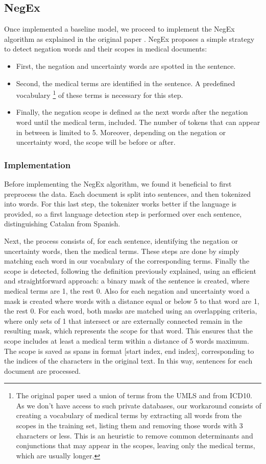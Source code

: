 \documentclass{article}
\begin{document}
\subsection*{NegEx}
Once implemented a baseline model, we proceed to implement the NegEx algorithm as explained in the original
paper \cite{negex}. NegEx proposes a simple strategy to detect negation words and their scopes in medical documents:
\begin{itemize}
	\item First, the negation and uncertainty words are spotted in the sentence. 
	\item Second, the medical terms are identified in the sentence. A predefined vocabulary \footnote{The original
	paper used a union of terms from the UMLS and from ICD10. As we don’t have access to such private databases,
	our workaround consists of creating a vocabulary of medical terms by extracting all words from the scopes in the
	training set, listing them and removing those words with 3 characters or less. This is an heuristic to remove common
	determinants and conjunctions that may appear in the scopes, leaving only the medical terms, which are usually
	longer.} of these terms is necessary for this step.
	\item Finally, the negation scope is defined as the next words after the negation word until the medical term,
	included. The number of tokens that can appear in between is limited to 5. Moreover, depending on the negation
	or uncertainty word, the scope will be before or after.
\end{itemize}

\subsubsection*{Implementation}
Before implementing the NegEx algorithm, we found it beneficial to first preprocess the data. Each document is split
into sentences, and then tokenized into words. For this last step, the tokenizer works better if the language is provided,
so a first language detection step is performed over each sentence, distinguishing Catalan from Spanish.

Next, the process consists of, for each sentence, identifying the negation or uncertainty words, then the medical terms.
These steps are done by simply matching each word in our vocabulary of the corresponding terms. Finally the scope is detected,
following the definition previously explained, using an efficient and straightforward approach: a binary mask of the sentence
is created, where medical terms are 1, the rest 0. Also for each negation and uncertainty word a mask is created where words
with a distance equal or below 5 to that word are 1, the rest 0. For each word, both masks are matched using an overlapping
criteria, where only sets of 1 that intersect or are externally connected remain in the resulting mask, which represents the
scope for that word. This ensures that the scope includes at least a medical term within a distance of 5 words maximum.
The scope is saved as spans in format [start index, end index], corresponding to the indices of the characters in the original
text. In this way, sentences for each document are processed.
\end{document}
